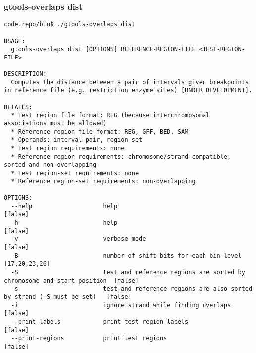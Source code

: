 \subsubsection{gtools-overlaps dist}\label{gtools-overlaps_dist}
\begin{lstlisting}
code.repo/bin$ ./gtools-overlaps dist

USAGE:
  gtools-overlaps dist [OPTIONS] REFERENCE-REGION-FILE <TEST-REGION-FILE>

DESCRIPTION:
  Computes the distance between a pair of intervals given breakpoints in reference file (e.g. restriction enzyme sites) [UNDER DEVELOPMENT].

DETAILS:
  * Test region file format: REG (because interchromosomal associations must be allowed)
  * Reference region file format: REG, GFF, BED, SAM
  * Operands: interval pair, region-set
  * Test region requirements: none
  * Reference region requirements: chromosome/strand-compatible, sorted and non-overlapping
  * Test region-set requirements: none
  * Reference region-set requirements: non-overlapping

OPTIONS:
  --help                    help                                                                    [false]
  -h                        help                                                                    [false]
  -v                        verbose mode                                                            [false]
  -B                        number of shift-bits for each bin level                                 [17,20,23,26]
  -S                        test and reference regions are sorted by chromosome and start position  [false]
  -s                        test and reference regions are also sorted by strand (-S must be set)   [false]
  -i                        ignore strand while finding overlaps                                    [false]
  --print-labels            print test region labels                                                [false]
  --print-regions           print test regions                                                      [false]
\end{lstlisting}
%
